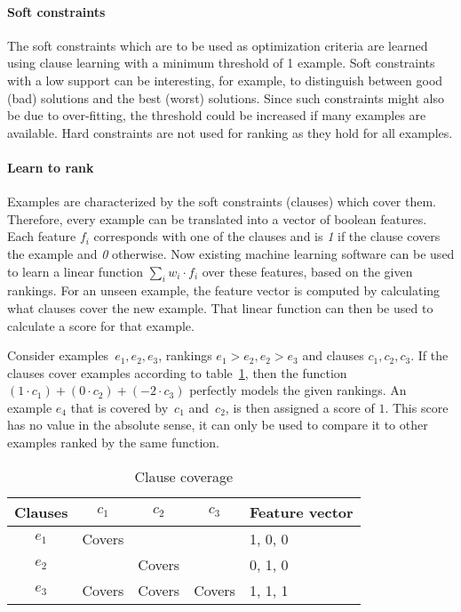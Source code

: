 \paragraph{Soft constraints}
The soft constraints which are to be used as optimization criteria are learned using clause learning with a minimum threshold of 1 example.
Soft constraints with a low support can be interesting, for example, to distinguish between good (bad) solutions and the best (worst) solutions.
Since such constraints might also be due to over-fitting, the threshold could be increased if many examples are available.
Hard constraints are not used for ranking as they hold for all examples.

\paragraph{Learn to rank}
Examples are characterized by the soft constraints (clauses) which cover them.
Therefore, every example can be translated into a vector of boolean features.
Each feature $f_i$ corresponds with one of the clauses and is \emph{1} if the clause covers the example and \emph{0} otherwise.
Now existing machine learning software can be used to learn a linear function $\sum_i w_i \cdot f_i$ over these features, based on the given rankings.
For an unseen example, the feature vector is computed by calculating what clauses cover the new example.
That linear function can then be used to calculate a score for that example.

\begin{example}
	Consider examples~$e_1, e_2, e_3$, rankings $e_1 > e_2, e_2 > e_3$ and clauses $c_1, c_2, c_3$.
	If the clauses cover examples according to table~\ref{tbl:cover_examples}, then the function $(1 \cdot c_1) + (0\cdot c_2) + (-2\cdot c_3)$ perfectly models the given rankings.
	An example $e_4$ that is covered by~$c_1$ and~$c_2$, is then assigned a score of $1$.
	This score has no value in the absolute sense, it can only be used to compare it to other examples ranked by the same function.

	\begin{table}[!htp]
	\label{tbl:cover_examples}
	\begin{tabularx}{\textwidth}{c|ccc|X}
		\textbf{Clauses}	&$c_1$  	& $c_2$ 	& $c_3$ 	& \textbf{Feature vector}\\
		\toprule
		$e_1$ 				& Covers 	&  			&  			& 1, 0, 0\\
		$e_2$ 				& 			& Covers	&  			& 0, 1, 0\\
		$e_3$ 				& Covers 	& Covers 	& Covers 	& 1, 1, 1\\
	\end{tabularx}
	\caption{Clause coverage}
	\end{table}

\end{example}

